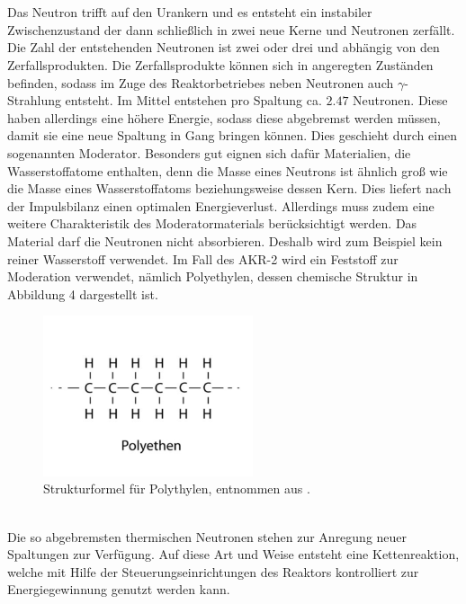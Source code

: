 \documentclass[german,  %
parskip=full,  %
]{scrartcl}
\begin{document}
\\\\
Das Neutron trifft auf den Urankern und es entsteht ein instabiler Zwischenzustand der dann schließlich in zwei neue Kerne und Neutronen zerfällt. Die Zahl der entstehenden Neutronen ist zwei oder drei und abhängig von den Zerfallsprodukten. Die Zerfallsprodukte können sich in angeregten Zuständen befinden, sodass im Zuge des Reaktorbetriebes neben Neutronen auch $\gamma$-Strahlung entsteht. Im Mittel entstehen pro Spaltung ca. $2.47$ Neutronen. Diese haben allerdings eine höhere Energie, sodass diese abgebremst werden müssen, damit sie eine neue Spaltung in Gang bringen können. Dies geschieht durch einen sogenannten Moderator. Besonders gut eignen sich dafür Materialien, die Wasserstoffatome enthalten, denn die Masse eines Neutrons ist ähnlich groß wie die Masse eines Wasserstoffatoms beziehungsweise dessen Kern. Dies liefert nach der Impulsbilanz einen optimalen Energieverlust. Allerdings muss zudem eine weitere Charakteristik des Moderatormaterials berücksichtigt werden. Das Material darf die Neutronen nicht absorbieren. Deshalb wird zum Beispiel kein reiner Wasserstoff verwendet. Im Fall des AKR-2 wird ein Feststoff zur Moderation verwendet, nämlich Polyethylen, dessen chemische Struktur in Abbildung 4 dargestellt ist.
\\
\begin{figure}[h!]\centering
\includegraphics[width=0.55\textwidth]{pe}
\caption{Strukturformel für Polythylen, entnommen aus \cite{pe}.}
\end{figure}
\\
Die so abgebremsten thermischen Neutronen stehen zur Anregung neuer Spaltungen zur Verfügung. Auf diese Art und Weise entsteht eine Kettenreaktion, welche mit Hilfe der Steuerungseinrichtungen des Reaktors kontrolliert zur Energiegewinnung genutzt werden kann.
\end{document}
